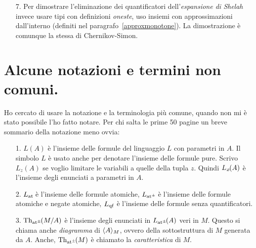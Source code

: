 \begin{itemize}
\item[7.] Per dimostrare l'eliminazione dei quantificatori dell'\emph{espansione di Shelah\/} invece usare tipi con definizioni \textit{oneste\/}, uso insiemi con approssimazioni dall'interno (definiti nel paragrafo~\ref{approxmonotone}). La dimostrazione \`e comunque la stessa di Chernikov-Simon.
\end{itemize}

% 
% 
 \section*{Alcune notazioni e termini non comuni.}

Ho cercato di usare la notazione e la terminologia pi\`u comune, quando non mi \`e stato possibile l'ho fatto notare. Per chi salta le prime 50 pagine un breve sommario della notazione meno ovvia:


\begin{itemize}

\item[1.] \emph{$L(A)$\/} \`e l'insieme delle formule del linguaggio $L$ con parametri in $A$. Il simbolo \emph{$L$\/} \`e usato anche per denotare l'insieme delle formule pure. Scrivo \emph{$L_z(A)$} se voglio limitare le variabili a quelle della tupla $z$. Quindi \emph{$L_{\mbox{\tiny$\varnothing$}\!}(A)$} \`e l'insieme degli enunciati a parametri in $A$.

\item[2.] \emph{$L_{\tiny\rm at}\hskip-.3ex$\/} \`e l'insieme delle formule atomiche, \emph{$L_{{\tiny\rm at^\pm}}\hskip-.3ex$\/} \`e l'insieme delle formule atomiche e negate atomiche, \emph{$L_{\rm qf}$\/} \`e l'insieme delle formule senza quantificatori.

\item[3.] \emph{$\textrm{Th}_{{\tiny\rm at^\pm}}\hskip-.3ex(M/A)$\/} \`e l'insieme degli enunciati in $L_{{\tiny\rm at^\pm}}\hskip-.3ex(A)$ veri in $M$. Questo si chiama anche \emph{diagramma\/} di \emph{$\langle A\rangle_M$}, ovvero della sottostruttura di $M$ generata da $A$. Anche, $\textrm{Th}_{{\tiny\rm at^\pm}}\hskip-.3ex(M)$ \`e chiamato la \emph{caratteristica\/} di $M$. 

\end{itemize}